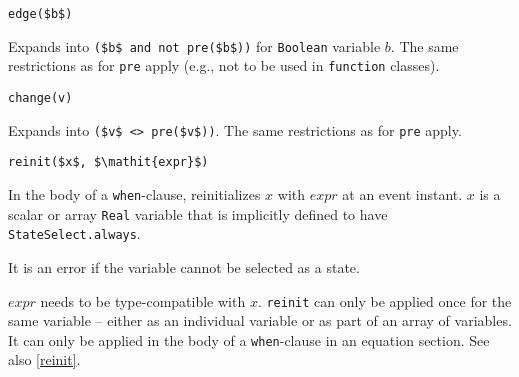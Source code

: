 \begin{operatordefinition}[edge]
\begin{synopsis}\begin{lstlisting}
edge($b$)
\end{lstlisting}\end{synopsis}
\begin{semantics}
Expands into \lstinline!($b$ and not pre($b$))! for \lstinline!Boolean! variable $b$.
The same restrictions as for \lstinline!pre! apply (e.g., not to be used in \lstinline!function! classes).
\end{semantics}
\end{operatordefinition}

\begin{operatordefinition}[change]
\begin{synopsis}\begin{lstlisting}
change(v)
\end{lstlisting}\end{synopsis}
\begin{semantics}
Expands into \lstinline!($v$ <> pre($v$))!.
The same restrictions as for \lstinline!pre! apply.
\end{semantics}
\end{operatordefinition}

\begin{operatordefinition}[reinit]
\begin{synopsis}\begin{lstlisting}
reinit($x$, $\mathit{expr}$)
\end{lstlisting}\end{synopsis}
\begin{semantics}
In the body of a \lstinline!when!-clause, reinitializes $x$ with $\mathit{expr}$ at an event instant.
$x$ is a scalar or array \lstinline!Real! variable that is implicitly defined to have \lstinline!StateSelect.always!.
\begin{nonnormative}
It is an error if the variable cannot be selected as a state.
\end{nonnormative}
$\mathit{expr}$ needs to be type-compatible with $x$.
\lstinline!reinit! can only be applied once for the same variable -- either as an individual variable or as part of an array of variables.
It can only be applied in the body of a \lstinline!when!-clause in an equation section.
See also \cref{reinit}.
\end{semantics}
\end{operatordefinition}


